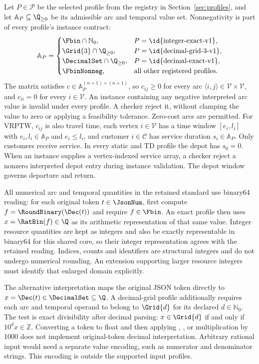 Let $P\in\mathcal{P}$ be the selected profile from the registry in Section~\ref{sec:profiles}, and let $\mathbb{A}_P\subseteq\Q_{\geq0}$ be its admissible arc and temporal value set. Nonnegativity is part of every profile's instance contract:
\begin{equation}\label{eq:profile-domains}
\mathbb{A}_P=\begin{cases}
\Fbin\cap\mathbb{N}_0, & P=\text{\id{integer-exact-v1}},\\
\Grid{3}\cap\Q_{\geq0}, & P=\text{\id{decimal-grid-3-v1}},\\
\DecimalSet\cap\Q_{\geq0}, & P=\text{\id{decimal-exact-v1}},\\
\FbinNonneg, & \text{all other registered profiles}.
\end{cases}
\end{equation}
The matrix satisfies $c\in\mathbb{A}_P^{(n+1)\times(n+1)}$, so $c_{ij}\geq0$ for every arc $\langle i,j\rangle\in\mathcal{V}\times\mathcal{V}$, and $c_{ii}=0$ for every $i\in\mathcal{V}$. An instance containing any negative interpreted arc value is invalid under every profile. A checker \must{} reject it, without clamping the value to zero or applying a feasibility tolerance. Zero-cost arcs are permitted. For VRPTW, $c_{ij}$ is also travel time, each vertex $i\in\mathcal{V}$ has a time window $[e_i,l_i]$ with $e_i,l_i\in\mathbb{A}_P$ and $e_i\leq l_i$, and customer $i\in\mathcal{C}$ has service duration $s_i\in\mathbb{A}_P$. Only customers receive service. In every static and TD profile the depot has $s_0=0$. When an instance supplies a vertex-indexed service array, a checker \must{} reject a nonzero interpreted depot entry during instance validation. The depot window governs departure and return.

All numerical arc and temporal quantities in the retained standard use binary64 reading: for each original token $t\in\JsonNum$, first compute $f=\RoundBinary(\Dec(t))$ and require $f\in\Fbin$. An exact profile then uses $x=\RatBin(f)\in\Q$ as its arithmetic representation of that same value. Integer resource quantities are kept as integers and \must{} also be exactly representable in binary64 for this shared core, so their integer representation agrees with the retained reading. Indices, counts and identifiers are structural integers and do not undergo numerical rounding. An extension supporting larger resource integers must identify that enlarged domain explicitly.

The alternative  interpretation maps the original JSON token directly to $x=\Dec(t)\in\DecimalSet\subseteq\Q$. A decimal-grid profile additionally requires each arc and temporal operand to belong to $\Grid{d}$ for its declared $d\in\mathbb{N}_0$. The test is exact divisibility after decimal parsing: $x\in\Grid{d}$ if and only if $10^d x\in\mathbb{Z}$. Converting a token to float and then applying , , or multiplication by 1000 does not implement original-token decimal interpretation. Arbitrary rational input would need a separate value encoding, such as numerator and denominator strings. This encoding is outside the supported input profiles.

